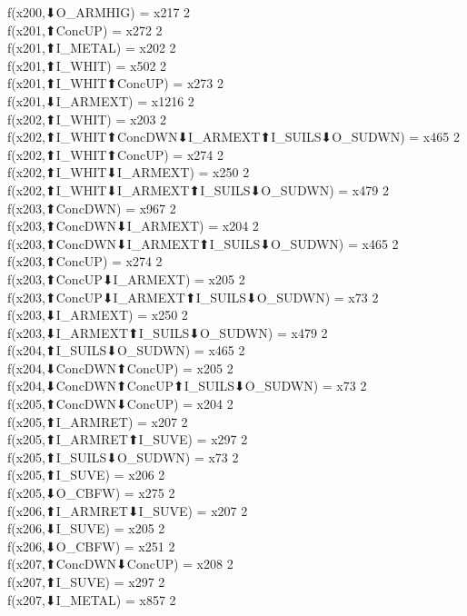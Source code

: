 f(x200,⬇O_ARMHIG) = x217 {2} \\
f(x201,⬆ConcUP) = x272 {2} \\
f(x201,⬆I_METAL) = x202 {2} \\
f(x201,⬆I_WHIT) = x502 {2} \\
f(x201,⬆I_WHIT⬆ConcUP) = x273 {2} \\
f(x201,⬇I_ARMEXT) = x1216 {2} \\
f(x202,⬆I_WHIT) = x203 {2} \\
f(x202,⬆I_WHIT⬆ConcDWN⬇I_ARMEXT⬆I_SUILS⬇O_SUDWN) = x465 {2} \\
f(x202,⬆I_WHIT⬆ConcUP) = x274 {2} \\
f(x202,⬆I_WHIT⬇I_ARMEXT) = x250 {2} \\
f(x202,⬆I_WHIT⬇I_ARMEXT⬆I_SUILS⬇O_SUDWN) = x479 {2} \\
f(x203,⬆ConcDWN) = x967 {2} \\
f(x203,⬆ConcDWN⬇I_ARMEXT) = x204 {2} \\
f(x203,⬆ConcDWN⬇I_ARMEXT⬆I_SUILS⬇O_SUDWN) = x465 {2} \\
f(x203,⬆ConcUP) = x274 {2} \\
f(x203,⬆ConcUP⬇I_ARMEXT) = x205 {2} \\
f(x203,⬆ConcUP⬇I_ARMEXT⬆I_SUILS⬇O_SUDWN) = x73 {2} \\
f(x203,⬇I_ARMEXT) = x250 {2} \\
f(x203,⬇I_ARMEXT⬆I_SUILS⬇O_SUDWN) = x479 {2} \\
f(x204,⬆I_SUILS⬇O_SUDWN) = x465 {2} \\
f(x204,⬇ConcDWN⬆ConcUP) = x205 {2} \\
f(x204,⬇ConcDWN⬆ConcUP⬆I_SUILS⬇O_SUDWN) = x73 {2} \\
f(x205,⬆ConcDWN⬇ConcUP) = x204 {2} \\
f(x205,⬆I_ARMRET) = x207 {2} \\
f(x205,⬆I_ARMRET⬆I_SUVE) = x297 {2} \\
f(x205,⬆I_SUILS⬇O_SUDWN) = x73 {2} \\
f(x205,⬆I_SUVE) = x206 {2} \\
f(x205,⬇O_CBFW) = x275 {2} \\
f(x206,⬆I_ARMRET⬇I_SUVE) = x207 {2} \\
f(x206,⬇I_SUVE) = x205 {2} \\
f(x206,⬇O_CBFW) = x251 {2} \\
f(x207,⬆ConcDWN⬇ConcUP) = x208 {2} \\
f(x207,⬆I_SUVE) = x297 {2} \\
f(x207,⬇I_METAL) = x857 {2} \\
